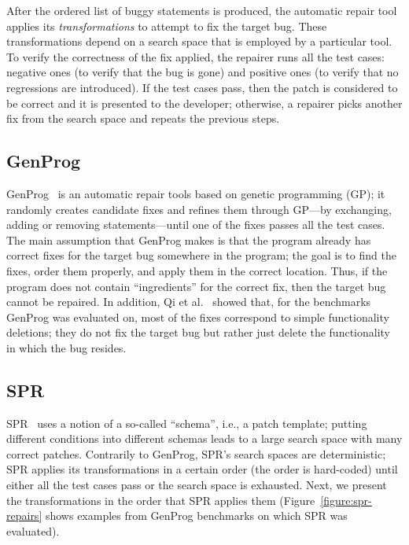 After the ordered list of buggy statements is produced, the automatic repair tool applies its \emph{transformations} to attempt to fix the target bug. These transformations depend on a search space that is employed by a particular tool. To verify the correctness of the fix applied, the repairer runs all the test cases: negative ones (to verify that the bug is gone) and positive ones (to verify that no regressions are introduced). If the test cases pass, then the patch is considered to be correct and it is presented to the developer; otherwise, a repairer picks another fix from the search space and repeats the previous steps.

\subsection{GenProg}

GenProg~\cite{le2012systematic} is an automatic repair tools based on genetic programming (GP); it randomly creates candidate fixes and refines them through GP---by exchanging, adding or removing statements---until one of the fixes passes all the test cases. The main assumption that GenProg makes is that the program already has correct fixes for the target bug somewhere in the program; the goal is to find the fixes, order them properly, and apply them in the correct location. Thus, if the program does not contain ``ingredients'' for the correct fix, then the target bug cannot be repaired. In addition, Qi et al.~\cite{qi2015analysis} showed that, for the benchmarks GenProg was evaluated on, most of the fixes correspond to simple functionality deletions; they do not fix the target bug but rather just delete the functionality in which the bug resides.

\subsection{SPR} 

SPR~\cite{long2015staged} uses a notion of a so-called ``schema'', i.e., a patch template; putting different conditions into different schemas leads to a large search space with many correct patches. Contrarily to GenProg, SPR's search spaces are deterministic; SPR applies its transformations in a certain order (the order is hard-coded) until either all the test cases pass or the search space is exhausted. Next, we present the transformations in the order that SPR applies them (Figure~\ref{figure:spr-repairs} shows examples from GenProg benchmarks on which SPR was evaluated).

